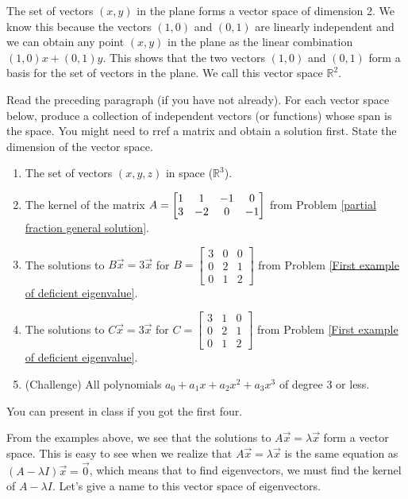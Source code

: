 The set of vectors $(x,y)$ in the plane forms a vector space of dimension 2.  We know this because the vectors $(1,0)$ and $(0,1)$ are linearly independent and we can obtain any point $(x,y)$ in the plane as the linear combination $(1,0)x+(0,1)y$. This shows that the two vectors $(1,0)$ and $(0,1)$ form a basis for the set of vectors in the plane. We call this vector space $\mathbb{R}^2$.  

\begin{problem}
Read the preceding paragraph (if you have not already). For each vector space below, produce a collection of independent vectors (or functions) whose span is the space. You might need to rref a matrix and obtain a solution first. State the dimension of the vector space. 
\begin{enumerate}
 \item The set of vectors $(x,y,z)$ in space ($\mathbb{R}^3$). 
 \item {}%
 The kernel of the matrix 
$A=\begin{bmatrix} 
1 & 1 & -1 & 0 \\
3 & -2 & 0 & -1
 \end{bmatrix}$ from Problem \ref{partial fraction general solution}. 
 \item 
 The solutions to $B\vec x = 3\vec x$ for 
$
B=
\begin{bmatrix}
 3 & 0 & 0 \\
 0 & 2 & 1 \\
 0 & 1 & 2
\end{bmatrix}
$ from Problem \ref{First example of deficient eigenvalue}.
\item The solutions to $C\vec x = 3\vec x$ for  
$
C=
\begin{bmatrix}
 3 & 1 & 0 \\
 0 & 2 & 1 \\
 0 & 1 & 2
\end{bmatrix}
$ from Problem \ref{First example of deficient eigenvalue}.
\item (Challenge) All polynomials $a_0+a_1x+a_2x^2+a_3x^3$ of degree 3 or less. 
\end{enumerate}
You can present in class if you got the first four. 
\end{problem}


From the examples above, we see that the solutions to $A\vec x = \lambda \vec x$ form a vector space. This is easy to see when we realize that $A\vec x = \lambda\vec x$ is the same equation as $(A-\lambda I)\vec x =\vec 0$, which means that to find eigenvectors, we must find the kernel of $A-\lambda I$. Let's give a name to this vector space of eigenvectors.

